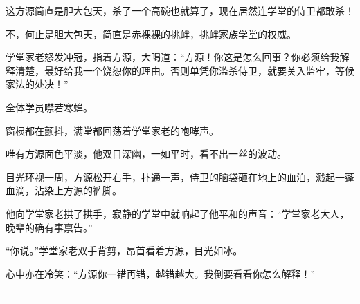 \begin{this_body}
这方源简直是胆大包天，杀了一个高碗也就算了，现在居然连学堂的侍卫都敢杀！

不，何止是胆大包天，简直是赤裸裸的挑衅，挑衅家族学堂的权威。

学堂家老怒发冲冠，指着方源，大喝道：“方源！你这是怎么回事？你必须给我解释清楚，最好给我一个饶恕你的理由。否则单凭你滥杀侍卫，就要关入监牢，等候家法的处决！”

全体学员噤若寒蝉。

窗棂都在颤抖，满堂都回荡着学堂家老的咆哮声。

唯有方源面色平淡，他双目深幽，一如平时，看不出一丝的波动。

目光环视一周，方源松开右手，扑通一声，侍卫的脑袋砸在地上的血泊，溅起一蓬血滴，沾染上方源的裤脚。

他向学堂家老拱了拱手，寂静的学堂中就响起了他平和的声音：“学堂家老大人，晚辈的确有事禀告。”

“你说。”学堂家老双手背剪，昂首看着方源，目光如冰。

心中亦在冷笑：“方源你一错再错，越错越大。我倒要看看你怎么解释！”

------------

\end{this_body}


